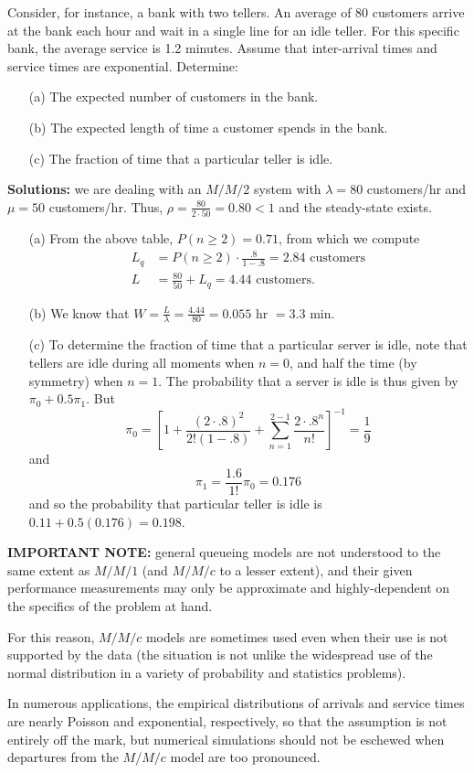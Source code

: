 \begin{Example} Consider, for instance, a bank with two tellers. An average of 80 customers arrive at the bank each hour and wait in a single line for an idle teller. For this specific bank, the average service is 1.2 minutes. Assume that inter-arrival times and service times are exponential. Determine:
\begin{itemize}[noitemsep]
	\item[(a)] The expected number of customers in the bank.
	\item[(b)] The expected length of time a customer spends in the bank.
	\item[(c)] The fraction of time that a particular teller is idle.
\end{itemize}
\textbf{Solutions:} we are dealing with an $M/M/2$ system with $\lambda =80 $ customers/hr and $\mu = 50$ customers/hr. Thus, $\rho = \frac{80}{2\cdot 50} = 0.80 < 1$ and the steady-state exists. 
\begin{itemize}[noitemsep]
	\item[(a)]  From the above table, $P(n \geq 2) = 0.71$, from which we compute 
\begin{align*} L_{q} &= P( n \geq 2)\cdot \frac{.8}{1-.8} = 2.84 \text{ customers}\\
L& = 	\frac{80}{50} + L_{q}	= 4.44 \text{ customers.} \end{align*}
\item[(b)]	We know that $W = \frac{L}{\lambda} = \frac{4.44}{80} = 0.055 \text{ hr }= 3.3 $ min.
\item[(c)] To determine the fraction of time that a particular server is idle, note that tellers are idle during all moments when $n=0 $, and half the time (by symmetry) when $n = 1$. The probability that a server is idle is thus given by $ \pi_{0} + 0.5 \pi_{1}$. But
 $$\pi_{0} = \left[1 + \frac{\left(2\cdot .8\right)^{2}}{2! \left(1-.8\right)} + \sum^{2-1}_{n=1} \frac{2\cdot .8^{n}}{n!}\right]^{-1}= \frac{1}{9}$$ and $$\pi_{1} = \frac{1.6}{1!} \pi_{0} = 0.176$$ and so the probability that particular teller is idle is $0.11 + 0.5(0.176) = 0.198$.
\end{itemize}
\end{Example}
\noindent \textbf{IMPORTANT NOTE:} general queueing models are not understood to the same extent as $M/M/1$ (and $M/M/c$ to a lesser extent), and their given performance measurements may only be approximate and highly-dependent on the specifics of the problem at hand. \par For this reason, $M/M/c$ models are sometimes used even when their use is not supported by the data (the situation is not unlike the widespread use of the normal distribution in a variety of probability and statistics problems). \par In numerous applications, the empirical distributions of arrivals and service times are nearly Poisson and exponential, respectively, so that the assumption is not entirely off the mark, but numerical simulations should not be eschewed when departures from the $M/M/c$ model are too pronounced.\vfill